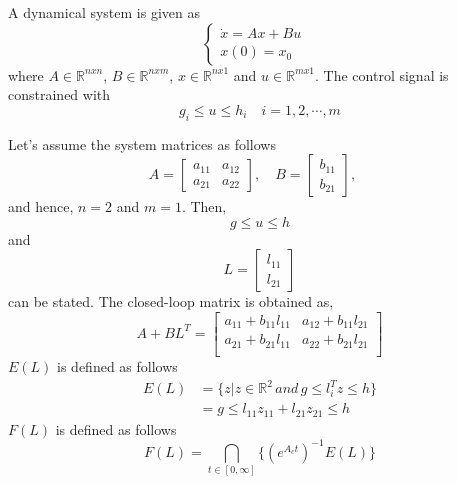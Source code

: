 A dynamical system is given as
\begin{equation}
    \begin{cases}
    \dot{x}=Ax+Bu&\\
    x(0)=x_0&
    \end{cases}
\end{equation}
where $A\in\mathbb{R}^{nxn}$, $B\in\mathbb{R}^{nxm}$, $x\in\mathbb{R}^{nx1}$ and $u\in\mathbb{R}^{mx1}$. The control signal is constrained with 
\begin{equation}
    g_i\leq u\leq h_i\quad i=1,2,\cdots,m
\end{equation}

Let's assume the system matrices as follows
\begin{equation}
    A=\begin{bmatrix}
        a_{11}& a_{12}\\
        a_{21}& a_{22}
    \end{bmatrix},\quad
    B=\begin{bmatrix}
        b_{11}\\b_{21}
    \end{bmatrix},\quad
\end{equation}
and hence, $n=2$ and $m=1$. Then,
\begin{equation}
    g\leq u\leq h
\end{equation}
and 
\begin{equation}
    L=\begin{bmatrix}
        l_{11}\\l_{21}
    \end{bmatrix}
\end{equation}
can be stated. The closed-loop matrix is obtained as,
\begin{equation}
    A+BL^T=\begin{bmatrix}
        a_{11} + b_{11}l_{11}& a_{12} + b_{11}l_{21}\\
        a_{21} + b_{21}l_{11}& a_{22} + b_{21}l_{21}\\
    \end{bmatrix}
\end{equation}
$E(L)$ is defined as follows
\begin{equation}
\begin{split}
    E(L)&=\{z|z\in\mathbb{R}^2\,and\,g\leq l_i^Tz\leq h\}\\
    &=g\leq l_{11}z_{11} + l_{21}z_{21}\leq h
\end{split}
\end{equation}
$F(L)$ is defined as follows
\begin{equation}
    F(L)=\bigcap\limits_{t\in[0,\infty]}\{(e^{A_ct})^{-1}E(L)\}
\end{equation}
